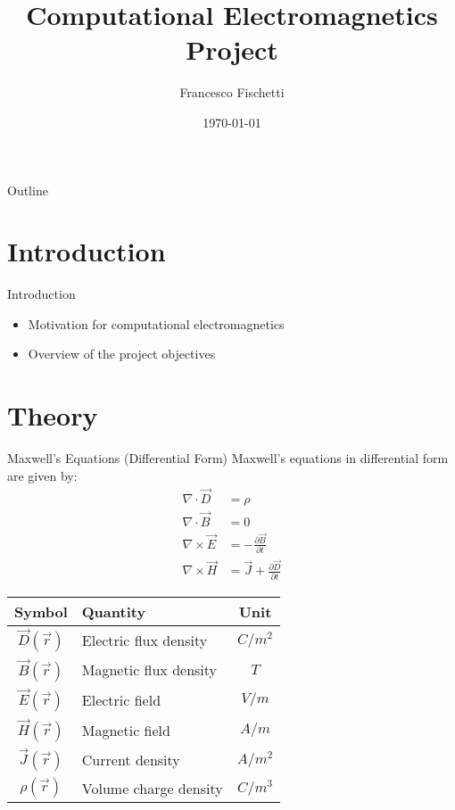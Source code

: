 \documentclass[aspectratio=54,xcolor=dvipsnames]{beamer}
\title{Computational Electromagnetics Project}
\author{Francesco Fischetti}
\institute{Politecnico di Milano}
\date{\today}
\begin{document}
\begin{frame}
    \titlepage
\end{frame}

\begin{frame}{Outline}
    \tableofcontents
\end{frame}

\section{Introduction}
\begin{frame}{Introduction}
    \begin{itemize}
        \item Motivation for computational electromagnetics
        \item Overview of the project objectives
    \end{itemize}
\end{frame}

\section{Theory}
\begin{frame}{Maxwell's Equations (Differential Form)}
    Maxwell's equations in differential form are given by:
    \begin{align*}
        \nabla \cdot \vec{D} &= \rho \\
        \nabla \cdot \vec{B} &= 0 \\
        \nabla \times \vec{E} &= -\frac{\partial \vec{B}}{\partial t} \\
        \nabla \times \vec{H} &= \vec{J} + \frac{\partial \vec{D}}{\partial t}
    \end{align*}

    \begin{center}
    \begin{tabular}{|c|l|c|}
        \hline
        Symbol & Quantity & Unit \\
        \hline
        $\vec{D}(\vec{r})$ & Electric flux density & $C/m^2$ \\
        $\vec{B}(\vec{r})$ & Magnetic flux density & $T$ \\
        $\vec{E}(\vec{r})$ & Electric field & $V/m$ \\
        $\vec{H}(\vec{r})$ & Magnetic field & $A/m$ \\
        $\vec{J}(\vec{r})$ & Current density & $A/m^2$ \\
        $\rho(\vec{r})$ & Volume charge density & $C/m^3$ \\
        \hline
    \end{tabular}
    \end{center}
\end{frame}
\end{document}
